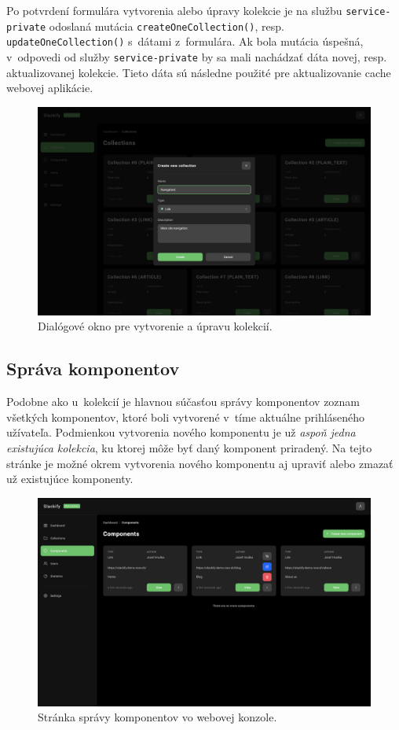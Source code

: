 \noindent Po potvrdení formulára vytvorenia alebo úpravy kolekcie je na službu \texttt{service-private} odoslaná mutácia \texttt{createOneCollection()}, resp. \texttt{updateOneCollection()} s~dátami z~formulára. Ak bola mutácia úspešná, v~odpovedi od služby \texttt{service-private} by sa mali nachádzať dáta novej, resp. aktualizovanej kolekcie. Tieto dáta sú následne použité pre aktualizovanie cache webovej aplikácie.

\begin{figure}[h]
	\centering
	\includegraphics[scale=0.085]{obrazky-figures/screenshot_collection_create}
	\caption{Dialógové okno pre vytvorenie a úpravu kolekcií.}
\end{figure}

\subsection{Správa komponentov}
Podobne ako u~kolekcií je hlavnou súčasťou správy komponentov zoznam všetkých komponentov, ktoré boli vytvorené v~tíme aktuálne prihláseného užívateľa. Podmienkou vytvorenia nového komponentu je už \emph{aspoň jedna existujúca kolekcia}, ku ktorej môže byť daný komponent priradený. Na tejto stránke je možné okrem vytvorenia nového komponentu aj upraviť alebo zmazať už existujúce komponenty.

\begin{figure}[h]
	\centering
	\includegraphics[scale=0.085]{obrazky-figures/screenshot_components}
	\caption{Stránka správy komponentov vo webovej konzole.}
\end{figure}


